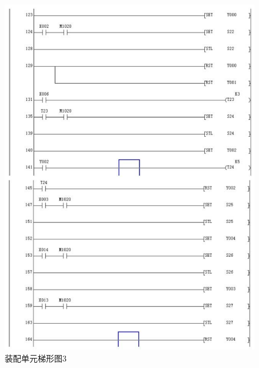 \documentclass[12pt]{article}
\begin{document}
\begin{figure}[htbp]
    \centering
    \includegraphics[scale=0.9]{fig/PLC3.png}
    \caption{装配单元梯形图3}
\end{figure} 
\end{document}
